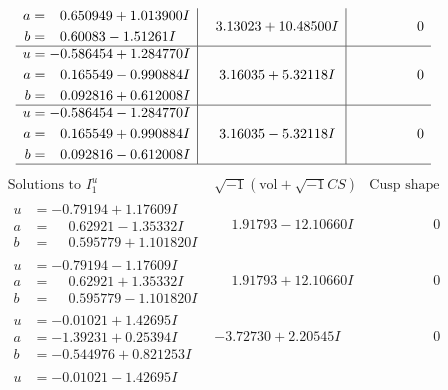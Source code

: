 \documentclass[1p]{elsarticle_modified}
\theoremstyle{definition}
\newcommand{\I}{\sqrt{-1}}
\begin{document}
$$\begin{array}{c|c|c}
\begin{aligned}
a &= \phantom{-}0.650949 + 1.013900 I \\
b &= \phantom{-}0.60083 - 1.51261 I\end{aligned}
 & \phantom{-}3.13023 + 10.48500 I & \phantom{-0.000000 } 0 \\ \hline\begin{aligned}
u &= -0.586454 + 1.284770 I \\
a &= \phantom{-}0.165549 - 0.990884 I \\
b &= \phantom{-}0.092816 + 0.612008 I\end{aligned}
 & \phantom{-}3.16035 + 5.32118 I & \phantom{-0.000000 } 0 \\ \hline\begin{aligned}
u &= -0.586454 - 1.284770 I \\
a &= \phantom{-}0.165549 + 0.990884 I \\
b &= \phantom{-}0.092816 - 0.612008 I\end{aligned}
 & \phantom{-}3.16035 - 5.32118 I & \phantom{-0.000000 } 0\\
 \hline 
 \end{array}$$\newpage$$\begin{array}{c|c|c}  
\text{Solutions to }I^u_{1}& \I (\text{vol} + \sqrt{-1}CS) & \text{Cusp shape}\\
 \hline 
\begin{aligned}
u &= -0.79194 + 1.17609 I \\
a &= \phantom{-}0.62921 - 1.35332 I \\
b &= \phantom{-}0.595779 + 1.101820 I\end{aligned}
 & \phantom{-}1.91793 - 12.10660 I & \phantom{-0.000000 } 0 \\ \hline\begin{aligned}
u &= -0.79194 - 1.17609 I \\
a &= \phantom{-}0.62921 + 1.35332 I \\
b &= \phantom{-}0.595779 - 1.101820 I\end{aligned}
 & \phantom{-}1.91793 + 12.10660 I & \phantom{-0.000000 } 0 \\ \hline\begin{aligned}
u &= -0.01021 + 1.42695 I \\
a &= -1.39231 + 0.25394 I \\
b &= -0.544976 + 0.821253 I\end{aligned}
 & -3.72730 + 2.20545 I & \phantom{-0.000000 } 0 \\ \hline\begin{aligned}
u &= -0.01021 - 1.42695 I \\

\end{aligned}
\end{array}$$
\end{document}
